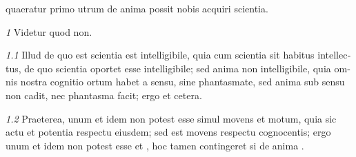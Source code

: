 \documentclass[a4paper, 12pt]{book}
\newcommand{\metatext}[1]{<#1>}
\newcommand{\no}[1]{\emph{#1}\quad}
\begin{document}
\begin{latin}
\beginnumbering

\pstart[\subsection*{\metatext{De scientia}}]
%
%
quaeratur
primo utrum de anima possit nobis acquiri scientia.
\pend

\medbreak

\pstart[\medbreak{}]
%
\no{1}
Videtur quod non.
\pend

\pstart
{}%
\no{1.1}
Illud de quo est scientia est intelligibile, quia cum scientia sit habitus
intellectus, de quo  scientia oportet esse intelligibile; sed anima non 
intelligibile, quia omnis nostra cognitio ortum habet a sensu,  sine phantasmate, sed anima sub sensu non cadit, nec
phantasma facit; ergo et cetera.
\pend

\pstart
{}%
\no{1.2}
Praeterea, unum et idem non potest esse simul movens et motum,
quia sic  actu et potentia respectu
eiusdem; sed  est movens respectu cognocentis; ergo unum et idem non
potest esse  et
, hoc tamen
contingeret si de anima .
\pend

\endnumbering
\end{latin}
\end{document}

